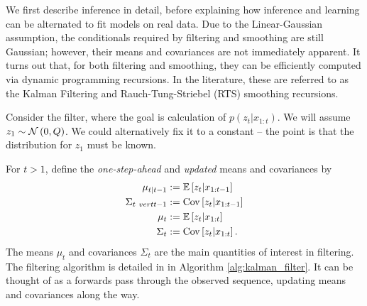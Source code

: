 We first describe inference in detail, before explaining how inference and
learning can be alternated to fit models on real data. Due to the
Linear-Gaussian assumption, the conditionals required by filtering and smoothing
are still Gaussian; however, their means and covariances are not immediately
apparent. It turns out that, for both filtering and smoothing, they can be
efficiently computed via dynamic programming recursions. In the literature,
these are referred to as the Kalman Filtering and Rauch-Tung-Striebel (RTS)
smoothing recursions.

Consider the filter, where the goal is calculation of $p\left(z_{t} \vert
x_{1:t}\right)$. We will assume $z_{1} \sim \mathcal{N}\left(0, Q\right)$. We
could alternatively fix it to a constant -- the point is that the distribution
for $z_{1}$ must be known.

For $t > 1$, define the \textit{one-step-ahead} and \textit{updated} means and
covariances by
\begin{align*}
  \mu_{t \vert t - 1} &:= \mathbb{E}\left[{z_{t} \vert x_{1:t - 1}}\right] \\
  \Sigma_{t \ vert t - 1} &:= \mathrm{Cov}\left[{z_{t} \vert x_{1:t - 1}}\right] \\
  \mu_{t} &:= \mathbb{E}\left[{z_{t} \vert x_{1:t}}\right] \\
  \Sigma_{t} &:= \mathrm{Cov}\left[{z_{t} \vert x_{1:t}}\right].
\end{align*}
The means $\mu_t$ and covariances $\Sigma_{t}$ are the main quantities of
interest in filtering. The filtering algorithm is detailed in in Algorithm
\ref{alg:kalman_filter}. It can be thought of as a forwards pass through the
observed sequence, updating means and covariances along the way.

